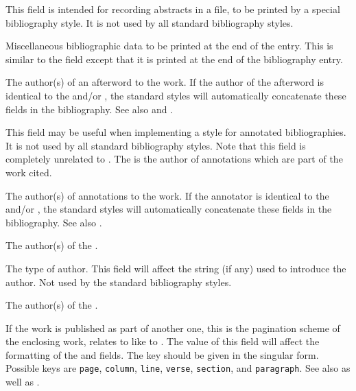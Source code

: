 \documentclass{ltxdockit}[2011/03/25]
\begin{document}
\begin{fieldlist}


This field is intended for recording abstracts in a  file, to be printed by a special bibliography style. It is not used by all standard bibliography styles.


Miscellaneous bibliographic data to be printed at the end of the entry. This is similar to the  field except that it is printed at the end of the bibliography entry.


The author(s) of an afterword to the work. If the author of the afterword is identical to the  and\slash or , the standard styles will automatically concatenate these fields in the bibliography. See also  and .


This field may be useful when implementing a style for annotated bibliographies. It is not used by all standard bibliography styles. Note that this field is completely unrelated to . The  is the author of annotations which are part of the work cited.


The author(s) of annotations to the work. If the annotator is identical to the  and\slash or , the standard styles will automatically concatenate these fields in the bibliography. See also .


The author(s) of the .


The type of author. This field will affect the string (if any) used to introduce the author. Not used by the standard bibliography styles.


The author(s) of the .


If the work is published as part of another one, this is the pagination scheme of the enclosing work, \ie {} relates to  like  to . The value of this field will affect the formatting of the  and  fields. The key should be given in the singular form. Possible keys are \texttt{page}, \texttt{column}, \texttt{line}, \texttt{verse}, \texttt{section}, and \texttt{paragraph}. See also  as well as .


\end{fieldlist}
\end{document}
